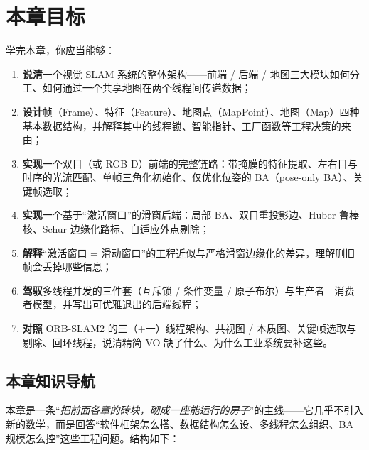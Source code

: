 \section*{本章目标}
学完本章，你应当能够：
\begin{enumerate}
  \item \textbf{说清}一个视觉 SLAM 系统的整体架构——前端 / 后端 / 地图三大模块如何分工、如何通过一个共享地图在两个线程间传递数据；
  \item \textbf{设计}帧（Frame）、特征（Feature）、地图点（MapPoint）、地图（Map）四种基本数据结构，并解释其中的线程锁、智能指针、工厂函数等工程决策的来由；
  \item \textbf{实现}一个双目（或 RGB-D）前端的完整链路：带掩膜的特征提取、左右目与时序的光流匹配、单帧三角化初始化、仅优化位姿的 BA（pose-only BA）、关键帧选取；
  \item \textbf{实现}一个基于“激活窗口”的滑窗后端：局部 BA、双目重投影边、Huber 鲁棒核、Schur 边缘化路标、自适应外点剔除；
  \item \textbf{解释}“激活窗口 = 滑动窗口”的工程近似与严格滑窗边缘化的差异，理解删旧帧会丢掉哪些信息；
  \item \textbf{驾驭}多线程并发的三件套（互斥锁 / 条件变量 / 原子布尔）与生产者—消费者模型，并写出可优雅退出的后端线程；
  \item \textbf{对照} ORB-SLAM2 的三（+一）线程架构、共视图 / 本质图、关键帧选取与剔除、回环线程，说清精简 VO 缺了什么、为什么工业系统要补这些。
\end{enumerate}

\subsection*{本章知识导航}
本章是一条“\emph{把前面各章的砖块，砌成一座能运行的房子}”的主线——它几乎不引入新的数学，而是回答“软件框架怎么搭、数据结构怎么设、多线程怎么组织、BA 规模怎么控”这些工程问题。结构如下：

